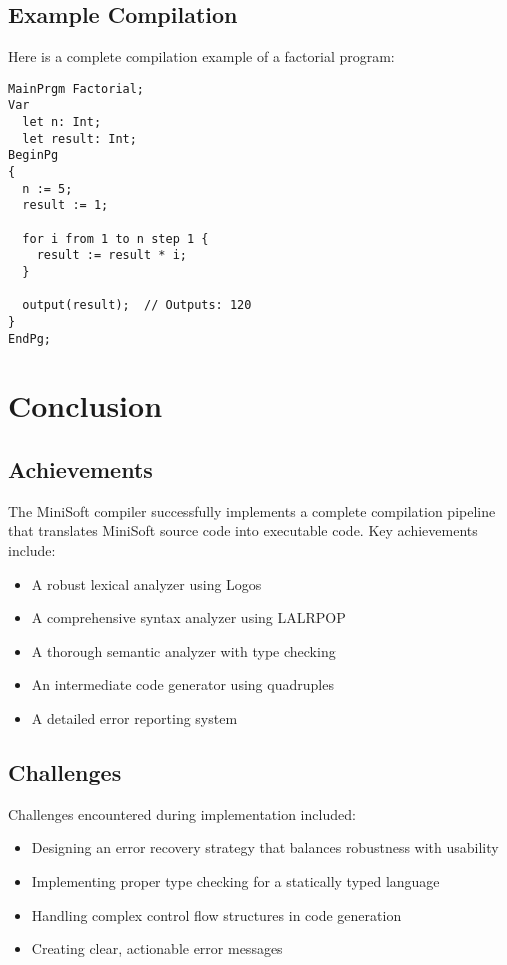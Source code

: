 \documentclass[12pt,a4paper]{article}
\begin{document}
\subsection{Example Compilation}
Here is a complete compilation example of a factorial program:

\begin{lstlisting}[caption={Sample MiniSoft Program}]
MainPrgm Factorial;
Var
  let n: Int;
  let result: Int;
BeginPg
{
  n := 5;
  result := 1;
  
  for i from 1 to n step 1 {
    result := result * i;
  }
  
  output(result);  // Outputs: 120
}
EndPg;
\end{lstlisting}

\section{Conclusion}
\subsection{Achievements}
The MiniSoft compiler successfully implements a complete compilation pipeline that translates MiniSoft source code into executable code. Key achievements include:

\begin{itemize}
	\item A robust lexical analyzer using Logos
	\item A comprehensive syntax analyzer using LALRPOP
	\item A thorough semantic analyzer with type checking
	\item An intermediate code generator using quadruples
	\item A detailed error reporting system
\end{itemize}

\subsection{Challenges}
Challenges encountered during implementation included:
\begin{itemize}
	\item Designing an error recovery strategy that balances robustness with usability
	\item Implementing proper type checking for a statically typed language
	\item Handling complex control flow structures in code generation
	\item Creating clear, actionable error messages
\end{itemize}
\end{document}

